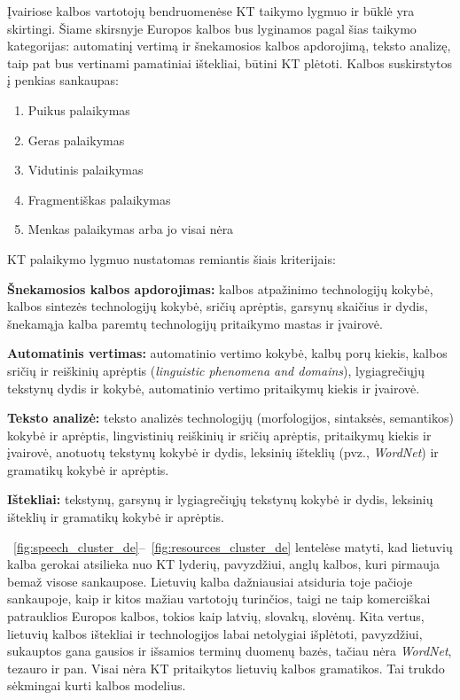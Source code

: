 \begin{multicols}{2}
 Įvairiose kalbos vartotojų bendruomenėse KT taikymo lygmuo ir būklė yra skirtingi. Šiame skirsnyje Europos kalbos bus lyginamos pagal šias taikymo kategorijas: automatinį vertimą ir šnekamosios kalbos apdorojimą, teksto analizę, taip pat bus vertinami pamatiniai ištekliai, būtini KT plėtoti. Kalbos suskirstytos į penkias sankaupas:

\begin{enumerate}
\item Puikus palaikymas
\item Geras palaikymas
\item Vidutinis palaikymas
\item Fragmentiškas palaikymas
\item Menkas palaikymas arba jo visai nėra
\end{enumerate}

KT palaikymo lygmuo nustatomas remiantis šiais kriterijais:

\textbf{Šnekamosios kalbos apdorojimas:} kalbos atpažinimo technologijų kokybė, kalbos sintezės technologijų kokybė, sričių aprėptis, garsynų skaičius ir dydis, šnekamąja kalba paremtų technologijų pritaikymo mastas ir įvairovė.

\textbf{Automatinis vertimas:} automatinio vertimo kokybė, kalbų porų kiekis, kalbos sričių ir reiškinių aprėptis (\textit{linguistic phenomena and domains}), lygiagrečiųjų tekstynų dydis ir kokybė, automatinio vertimo pritaikymų kiekis ir įvairovė.

\textbf{Teksto analizė:} teksto analizės technologijų (morfologijos, sintaksės, semantikos) kokybė ir aprėptis, lingvistinių reiškinių ir sričių aprėptis, pritaikymų kiekis ir įvairovė, anotuotų tekstynų kokybė ir dydis, leksinių išteklių (pvz., \textit{WordNet}) ir gramatikų kokybė ir aprėptis.

\textbf{Ištekliai:} tekstynų, garsynų ir lygiagrečiųjų tekstynų kokybė ir dydis, leksinių išteklių ir gramatikų kokybė ir aprėptis.

~\ref{fig:speech_cluster_de}–~\ref{fig:resources_cluster_de} lentelėse matyti, kad lietuvių kalba gerokai atsilieka nuo KT lyderių, pavyzdžiui, anglų kalbos, kuri pirmauja bemaž visose sankaupose. Lietuvių kalba dažniausiai atsiduria toje pačioje sankaupoje, kaip ir kitos mažiau vartotojų turinčios, taigi ne taip komerciškai patrauklios Europos kalbos, tokios kaip latvių, slovakų, slovėnų. Kita vertus, lietuvių kalbos ištekliai ir technologijos labai netolygiai išplėtoti, pavyzdžiui, sukauptos gana gausios ir išsamios terminų duomenų bazės, tačiau nėra \textit{WordNet}, tezauro ir pan. Visai nėra KT pritaikytos lietuvių kalbos gramatikos. Tai trukdo sėkmingai kurti kalbos modelius.


\end{multicols}
